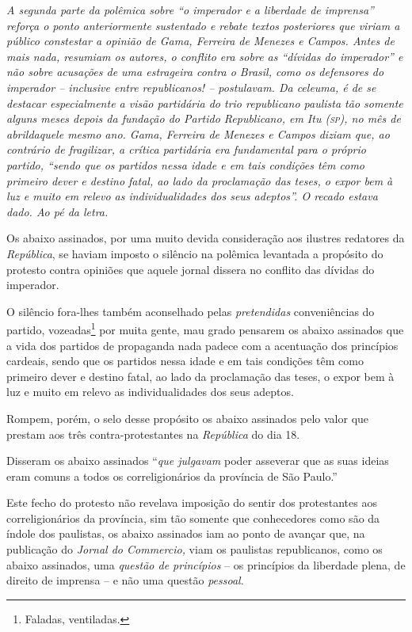\begin{didascalia}
\emph{A segunda parte da polêmica sobre ``o imperador e a liberdade de
imprensa'' reforça o ponto anteriormente sustentado e rebate textos
posteriores que viriam a público constestar a opinião de Gama, Ferreira
de Menezes e Campos. Antes de mais nada, resumiam os autores, o conflito
era sobre as ``dívidas do imperador'' e não sobre acusações de uma
estrageira contra o Brasil, como os defensores do imperador -- inclusive
entre republicanos! -- postulavam. Da celeuma, é de se destacar
especialmente a visão partidária do trio republicano paulista tão
somente alguns meses depois da fundação do Partido Republicano, em Itu
(\textsc{sp}), no mês de abrildaquele mesmo ano. Gama, Ferreira de Menezes e
Campos diziam que, ao contrário de fragilizar, a crítica partidária era
fundamental para o próprio partido, ``sendo que os partidos nessa idade e
em tais condições têm como primeiro dever e destino fatal, ao lado da
proclamação das teses, o expor bem à luz e muito em relevo as
individualidades dos seus adeptos''. O recado estava dado. Ao pé da
letra.}
\end{didascalia}

Os abaixo assinados, por uma muito devida consideração aos ilustres
redatores da \emph{República}, se haviam imposto o silêncio na polêmica
levantada a propósito do protesto contra opiniões que aquele jornal
dissera no conflito das dívidas do imperador.

O silêncio fora-lhes também aconselhado pelas \emph{pretendidas}
conveniências do partido, vozeadas\footnote{ Faladas, ventiladas.} por
muita gente, mau grado pensarem os abaixo assinados que a vida dos
partidos de propaganda nada padece com a acentuação dos princípios
cardeais, sendo que os partidos nessa idade e em tais condições têm como
primeiro dever e destino fatal, ao lado da proclamação das teses, o
expor bem à luz e muito em relevo as individualidades dos seus adeptos.

Rompem, porém, o selo desse propósito os abaixo assinados pelo valor que
prestam aos três contra-protestantes na \emph{República} do dia 18.

Disseram os abaixo assinados ``\emph{que julgavam} poder asseverar que as
suas ideias eram comuns a todos os correligionários da província de São
Paulo.''

Este fecho do protesto não revelava imposição do sentir dos protestantes
aos correligionários da província, sim tão somente que conhecedores como
são da índole dos paulistas, os abaixo assinados iam ao ponto de avançar
que, na publicação do \emph{Jornal do Commercio,} viam os paulistas
republicanos, como os abaixo assinados, uma \emph{questão de princípios}
-- os princípios da liberdade plena, de direito de imprensa -- e não uma
questão \emph{pessoal}.

